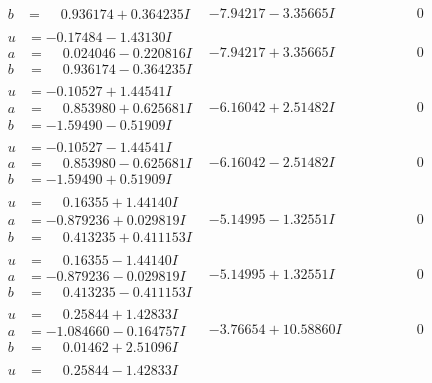 \documentclass[1p]{elsarticle_modified}
\theoremstyle{definition}
\begin{document}
$$\begin{array}{c|c|c}
\begin{aligned}
b &= \phantom{-}0.936174 + 0.364235 I\end{aligned}
 & -7.94217 - 3.35665 I & \phantom{-0.000000 } 0 \\ \hline\begin{aligned}
u &= -0.17484 - 1.43130 I \\
a &= \phantom{-}0.024046 - 0.220816 I \\
b &= \phantom{-}0.936174 - 0.364235 I\end{aligned}
 & -7.94217 + 3.35665 I & \phantom{-0.000000 } 0 \\ \hline\begin{aligned}
u &= -0.10527 + 1.44541 I \\
a &= \phantom{-}0.853980 + 0.625681 I \\
b &= -1.59490 - 0.51909 I\end{aligned}
 & -6.16042 + 2.51482 I & \phantom{-0.000000 } 0 \\ \hline\begin{aligned}
u &= -0.10527 - 1.44541 I \\
a &= \phantom{-}0.853980 - 0.625681 I \\
b &= -1.59490 + 0.51909 I\end{aligned}
 & -6.16042 - 2.51482 I & \phantom{-0.000000 } 0 \\ \hline\begin{aligned}
u &= \phantom{-}0.16355 + 1.44140 I \\
a &= -0.879236 + 0.029819 I \\
b &= \phantom{-}0.413235 + 0.411153 I\end{aligned}
 & -5.14995 - 1.32551 I & \phantom{-0.000000 } 0 \\ \hline\begin{aligned}
u &= \phantom{-}0.16355 - 1.44140 I \\
a &= -0.879236 - 0.029819 I \\
b &= \phantom{-}0.413235 - 0.411153 I\end{aligned}
 & -5.14995 + 1.32551 I & \phantom{-0.000000 } 0 \\ \hline\begin{aligned}
u &= \phantom{-}0.25844 + 1.42833 I \\
a &= -1.084660 - 0.164757 I \\
b &= \phantom{-}0.01462 + 2.51096 I\end{aligned}
 & -3.76654 + 10.58860 I & \phantom{-0.000000 } 0 \\ \hline\begin{aligned}
u &= \phantom{-}0.25844 - 1.42833 I \\

\end{aligned}
\end{array}$$
\end{document}
